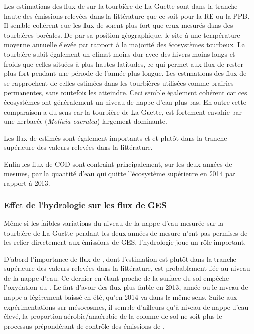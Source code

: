 Les estimations des flux de \coo sur la tourbière de La Guette sont dans la tranche haute des émissions relevées dans la littérature que ce soit pour la RE ou la PPB.
Il semble cohérent que les flux de \coo soient plus fort que ceux mesurés dans des tourbières boréales.
De par sa position géographique, le site à une température moyenne annuelle élevée par rapport à la majorité des écosystèmes tourbeux.
La tourbière subit également un climat moins dur avec des hivers moins longs et froids que celles situées à plus hautes latitudes, ce qui permet aux flux de rester plus fort pendant une période de l'année plus longue.
Les estimations des flux de \coo se rapprochent de celles estimées dans les tourbières utilisées comme prairies permanentes, sans toutefois les atteindre.
Ceci semble également cohérent car ces écosystèmes ont généralement un niveau de nappe d'eau plus bas.
En outre cette comparaison a du sens car la tourbière de La Guette, est fortement envahie par une herbacée (\textit{Molinia caerulea}) largement dominante.

Les flux de \chh estimés sont également importants et et plutôt dans la tranche supérieure des valeurs relevées dans la littérature.

Enfin les flux de COD sont contraint principalement, sur les deux années de mesures, par la quantité d'eau qui quitte l'écosystème supérieure en 2014 par rapport à 2013.

\subsubsection{Effet de l'hydrologie sur les flux de GES}

Même si les faibles variations du niveau de la nappe d'eau mesurée sur la tourbière de La Guette pendant les deux années de mesure n'ont pas permises de les relier directement aux émissions de GES, l'hydrologie joue un rôle important.

D'abord l'importance de flux de \chh, dont l'estimation est plutôt dans la tranche supérieure des valeurs relevées dans la littérature, est probablement liée au niveau de la nappe d'eau.
Ce dernier en étant proche de la surface du sol empêche l'oxydation du \chh.
Le fait d'avoir des flux plus faible en 2013, année ou le niveau de nappe a légèrement baissé en été, qu'en 2014 va dans le même sens.
Suite aux expérimentations sur mésocosmes, il semble d'ailleurs qu'à niveau de nappe d'eau élevé, la proportion aérobie/anaérobie de la colonne de sol ne soit plus le processus prépondérant de contrôle des émissions de \chh.

